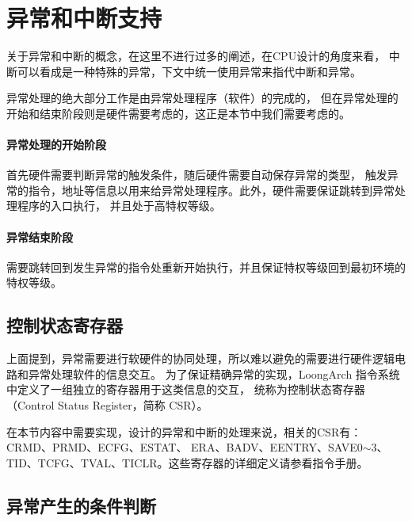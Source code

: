 \section{异常和中断支持}


\begin{center}
\end{center}

关于异常和中断的概念，在这里不进行过多的阐述，在CPU设计的角度来看，
中断可以看成是一种特殊的异常，下文中统一使用异常来指代中断和异常。

异常处理的绝大部分工作是由异常处理程序（软件）的完成的，
但在异常处理的开始和结束阶段则是硬件需要考虑的，这正是本节中我们需要考虑的。

\paragraph{异常处理的开始阶段} 首先硬件需要判断异常的触发条件，随后硬件需要自动保存异常的类型，
触发异常的指令，地址等信息以用来给异常处理程序。此外，硬件需要保证跳转到异常处理程序的入口执行，
并且处于高特权等级。

\paragraph{异常结束阶段} 需要跳转回到发生异常的指令处重新开始执行，并且保证特权等级回到最初环境的特权等级。


\subsection{控制状态寄存器}

上面提到，异常需要进行软硬件的协同处理，所以难以避免的需要进行硬件逻辑电路和异常处理软件的信息交互。
为了保证精确异常的实现，LoongArch 指令系统中定义了一组独立的寄存器用于这类信息的交互，
统称为控制状态寄存器（Control Status Register，简称 CSR）。

在本节内容中需要实现，设计的异常和中断的处理来说，相关的CSR有：CRMD、PRMD、ECFG、ESTAT、
ERA、BADV、EENTRY、SAVE0$\sim$3、TID、TCFG、TVAL、TICLR。这些寄存器的详细定义请参看指令手册。

\subsection{异常产生的条件判断}

